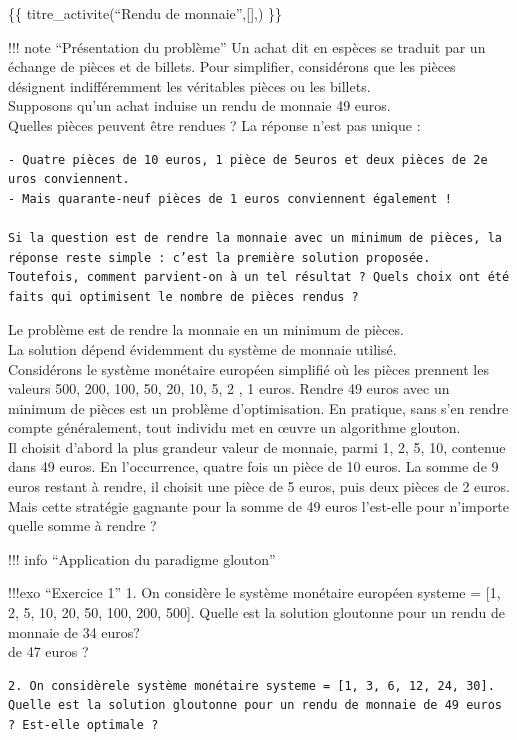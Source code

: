 \{\{ titre\_activite(``Rendu de monnaie'',{[}{]},) \}\}

!!! note ``Présentation du problème'' Un achat dit en espèces se traduit
par un échange de pièces et de billets. Pour simplifier, considérons que
les pièces désignent indifféremment les véritables pièces ou les
billets.\\
Supposons qu'un achat induise un rendu de monnaie 49 euros.\\
Quelles pièces peuvent être rendues ? La réponse n'est pas unique :

\begin{verbatim}
- Quatre pièces de 10 euros, 1 pièce de 5euros et deux pièces de 2e uros conviennent.  
- Mais quarante-neuf pièces de 1 euros conviennent également !  

Si la question est de rendre la monnaie avec un minimum de pièces, la réponse reste simple : c’est la première solution proposée.  
Toutefois, comment parvient-on à un tel résultat ? Quels choix ont été faits qui optimisent le nombre de pièces rendus ?  
\end{verbatim}

Le problème est de rendre la monnaie en un minimum de pièces.\\
La solution dépend évidemment du système de monnaie utilisé.\\
Considérons le système monétaire européen simplifié où les pièces
prennent les valeurs 500, 200, 100, 50, 20, 10, 5, 2 , 1 euros. Rendre
49 euros avec un minimum de pièces est un problème d'optimisation. En
pratique, sans s'en rendre compte généralement, tout individu met en
œuvre un algorithme glouton.\\
Il choisit d'abord la plus grandeur valeur de monnaie, parmi 1, 2, 5,
10, contenue dans 49 euros. En l'occurrence, quatre fois un pièce de 10
euros. La somme de 9 euros restant à rendre, il choisit une pièce de 5
euros, puis deux pièces de 2 euros.\\
Mais cette stratégie gagnante pour la somme de 49 euros l'est-elle pour
n'importe quelle somme à rendre ?

!!! info ``Application du paradigme glouton''

!!!exo ``Exercice 1'' 1. On considère le système monétaire européen
systeme = {[}1, 2, 5, 10, 20, 50, 100, 200, 500{]}. Quelle est la
solution gloutonne pour un rendu de monnaie de 34 euros?\\
de 47 euros ?

\begin{verbatim}
2. On considèrele système monétaire systeme = [1, 3, 6, 12, 24, 30]. Quelle est la solution gloutonne pour un rendu de monnaie de 49 euros ? Est-elle optimale ? 
\end{verbatim}

